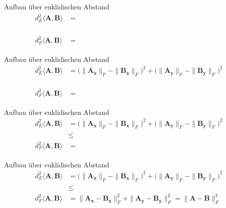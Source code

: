 \documentclass{beamer}
\begin{document}
\begin{frame}
\begin{overprint}
\begin{block}{Aufbau über euklidischen Abstand}
	\begin{align*}
	d_E^2\langle\mathbf{A},\mathbf{B}\rangle &= \phantom{\big(\|\mathbf{A_x}\|_F - \|\mathbf{B_x}\|_F\big)^2 + \big(\|\mathbf{A_y}\|_F - \|\mathbf{B_y}\|_F\big)^2} \\
	                                         &\phantom{\le} \nonumber \\
	d_F^2\langle\mathbf{A},\mathbf{B}\rangle &= \phantom{\|\mathbf{A_x} - \mathbf{B_x}\|_F^2 + \|\mathbf{A_y} - \mathbf{B_y}\|_F^2 = \|\mathbf{A} - \mathbf{B}\|_F^2}
	\end{align*}%
\end{block}
\begin{block}{Aufbau über euklidischen Abstand}
	\begin{align*}
	d_E^2\langle\mathbf{A},\mathbf{B}\rangle &= \big(\|\mathbf{A_x}\|_F - \|\mathbf{B_x}\|_F\big)^2 + \big(\|\mathbf{A_y}\|_F - \|\mathbf{B_y}\|_F\big)^2 \\
											 &\phantom{\le} \nonumber \\
	d_F^2\langle\mathbf{A},\mathbf{B}\rangle &= \phantom{\|\mathbf{A_x} - \mathbf{B_x}\|_F^2 + \|\mathbf{A_y} - \mathbf{B_y}\|_F^2 = \|\mathbf{A} - \mathbf{B}\|_F^2}
	\end{align*}%
\end{block}
\begin{block}{Aufbau über euklidischen Abstand}
	\begin{align*}
	d_E^2\langle\mathbf{A},\mathbf{B}\rangle &= \big(\|\mathbf{A_x}\|_F - \|\mathbf{B_x}\|_F\big)^2 + \big(\|\mathbf{A_y}\|_F - \|\mathbf{B_y}\|_F\big)^2 \\
											 &\le \nonumber \\
	d_F^2\langle\mathbf{A},\mathbf{B}\rangle &= \phantom{\|\mathbf{A_x} - \mathbf{B_x}\|_F^2 + \|\mathbf{A_y} - \mathbf{B_y}\|_F^2 = \|\mathbf{A} - \mathbf{B}\|_F^2}
	\end{align*}%
\end{block}
\begin{block}{Aufbau über euklidischen Abstand}
	\begin{align}
	d_E^2\langle\mathbf{A},\mathbf{B}\rangle &= \big(\|\mathbf{A_x}\|_F - \|\mathbf{B_x}\|_F\big)^2 + \big(\|\mathbf{A_y}\|_F - \|\mathbf{B_y}\|_F\big)^2 \\
	&\le \nonumber \\
	d_F^2\langle\mathbf{A},\mathbf{B}\rangle &= \|\mathbf{A_x} - \mathbf{B_x}\|_F^2 + \|\mathbf{A_y} - \mathbf{B_y}\|_F^2 = \|\mathbf{A} - \mathbf{B}\|_F^2
	\end{align}%
\end{block}
\end{overprint}
\end{frame}
\end{document}
